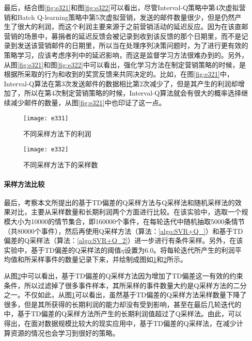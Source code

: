 最后，结合图\ref{fig:e321}和图\ref{fig:e322}可以看出，尽管Interval-Q策略中第4次虚拟营销和Batch Q-learning策略中第5次虚拟营销，发送的邮件数量很少，但是仍然产生了很大的利润，而这个利润主要来源于之前营销活动的延迟反应。因为在该直邮营销的场景中，募捐者的延迟反馈会被记录到收到该反馈的那个日期里，而不是记录到发送该营销邮件的日期里，所以当在处理序列决策问题时，为了进行更有效的策略学习，应该考虑序列中的延迟影响，而这是监督学习方法很难办到的。另外，从图\ref{fig:e321}和图\ref{fig:e322}中可以看出，强化学习方法在制定营销策略的时候，是根据所采取的行为和收到的奖赏反馈来共同决定的。比如，在图\ref{fig:e321}中，Interval-Q算法在第3次发送邮件的数据相比第2次减少了，但是其产生的利润却增加了，所以在第4次制定营销策略的时候，Interval-Q算法就会有很大的概率选择继续减少邮件的数量，从图\ref{fig:e321}中也印证了这一点。

\begin{figure}[htbp]
\centering
\texttt{[image: e331]}
\caption{不同采样方法下的利润}
\label{fig:e331}
\end{figure}

\begin{figure}[htbp]
\centering
\texttt{[image: e332]}
\caption{不同采样方法下的采样数}
\label{fig:e332}
\end{figure}

\paragraph{采样方法比较}
最后，考察本文所提出的基于TD偏差的Q采样方法与Q采样法和随机采样法的效果对比，主要从采样数量和长期利润两个方面进行比较。在该实验中，选取一个规模大小为10000的情节集合，即160000个事件，在每轮迭代中随机抽取5000条情节（共80000个事件），然后再使用Q采样方法（算法：\ref{algo:SVR+Q_}）和基于TD偏差的Q采样法（算法：\ref{algo:SVR+Q_2}）进一步进行有条件采样。另外，在该实验中，基于TD偏差的Q采样法的阈值$\eta$设置为6.0。将每轮迭代所产生的利润平均值和所采样事件的数量记录下来，并绘制成图如\ref{fig:e331}和\ref{fig:e332}所示。

从图\ref{fig:e332}中可以看出，基于TD偏差的Q采样方法因为增加了TD偏差这一有效的约束条件，所以过滤掉了很多事件样本，其所采样的事件数量大约是Q采样方法的二分之一。不仅如此，从图\ref{fig:e331}可以看出，虽然基于TD偏差的Q采样方法采样数量下降了很多，但是其所获得的长期利润的能力却没有受到影响，甚至在最后几轮迭代的中，基于TD偏差的Q采样方法所产生的长期利润值超过了Q采样法。由此，可以得出，在面对数据规模比较大的现实应用中，基于TD偏差的Q采样法，在减少计算资源的情况也会学习到很好的策略。


